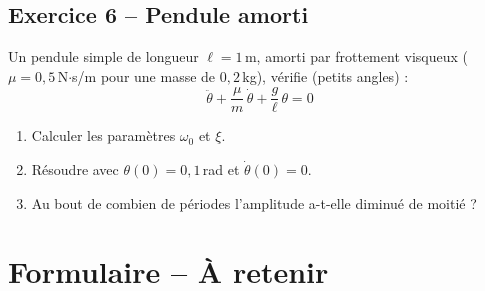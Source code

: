 \documentclass[a4paper,11pt]{article}
\begin{document}
\subsection*{Exercice 6 -- Pendule amorti}
Un pendule simple de longueur $\ell = 1\,$m, amorti par frottement visqueux ($\mu = 0{,}5\,$N$\cdot$s/m pour une masse de $0{,}2\,$kg), vérifie (petits angles) :
\[
\ddot{\theta} + \frac{\mu}{m}\,\dot{\theta} + \frac{g}{\ell}\,\theta = 0
\]
\begin{enumerate}[label=\alph*)]
  \item Calculer les paramètres $\omega_0$ et $\xi$.
  \item Résoudre avec $\theta(0) = 0{,}1\,$rad et $\dot{\theta}(0) = 0$.
  \item Au bout de combien de périodes l'amplitude a-t-elle diminué de moitié ?
\end{enumerate}

\newpage
\section*{Formulaire -- À retenir}
\end{document}
